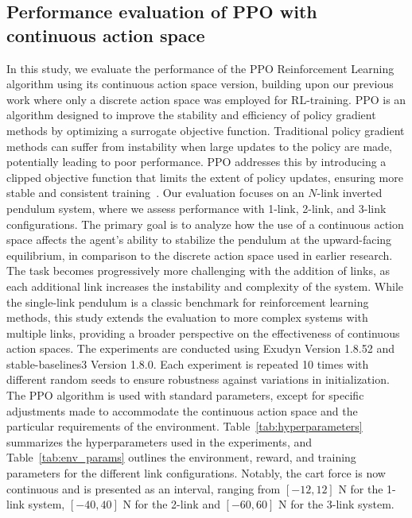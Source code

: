 \subsection{Performance evaluation of PPO with continuous action space} \label{subsec: Performance evaluation of PPO with continuous action space}

In this study, we evaluate the performance of the PPO Reinforcement Learning algorithm using its continuous action space version, building upon our previous work where only a discrete action space was employed for RL-training. PPO is an algorithm designed to improve the stability and efficiency of policy gradient methods by optimizing a surrogate objective function.
Traditional policy gradient methods can suffer from instability when large updates to the policy are made, potentially leading to poor performance. PPO addresses this by introducing a clipped objective function that limits the extent of policy updates, ensuring more stable and consistent training~\cite{schulman2017ppo}.
Our evaluation focuses on an $N$-link inverted pendulum system, where we assess performance with 1-link, 2-link, and 3-link configurations. The primary goal is to analyze how the use of a continuous action space affects the agent's ability to stabilize the pendulum at the upward-facing equilibrium, in comparison to the discrete action space used in earlier research. The task becomes progressively more challenging with the addition of links, as each additional link increases the instability and complexity of the system. While the single-link pendulum is a classic benchmark for reinforcement learning methods, this study extends the evaluation to more complex systems with multiple links, providing a broader perspective on the effectiveness of continuous action spaces.
The experiments are conducted using Exudyn Version 1.8.52 and stable-baselines3 Version 1.8.0. Each experiment is repeated 10 times with different random seeds to ensure robustness against variations in initialization. The PPO algorithm is used with standard parameters, except for specific adjustments made to accommodate the continuous action space and the particular requirements of the environment.
Table~\ref{tab:hyperparameters} summarizes the hyperparameters used in the experiments, and Table~\ref{tab:env_params} outlines the environment, reward, and training parameters for the different link configurations. Notably, the cart force is now continuous and is presented as an interval, ranging from \([-12, 12]\) N for the 1-link system, \([-40, 40]\) N for the 2-link and \([-60, 60]\) N for the 3-link system.

